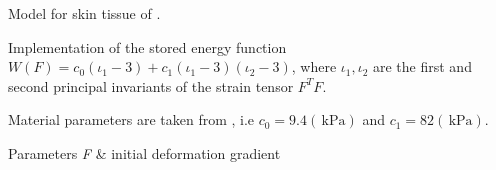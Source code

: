 Model for skin tissue of \cite{Hendriks2005}. 

Implementation of the stored energy function $W(F)=c_0(\iota_1-3) + c_1(\iota_1-3)(\iota_2-3)$, where $\iota_1,\iota_2$ are the first and second principal invariants of the strain tensor $F^T F$.

Material parameters are taken from \cite{Xu2011}, i.\-e $c_0=9.4 (\,\mathrm{kPa})$ and $ c_1 = 82 (\,\mathrm{kPa}) $.


\begin{DoxyParams}{Parameters}
{\em F} & initial deformation gradient \\
\hline
\end{DoxyParams}
